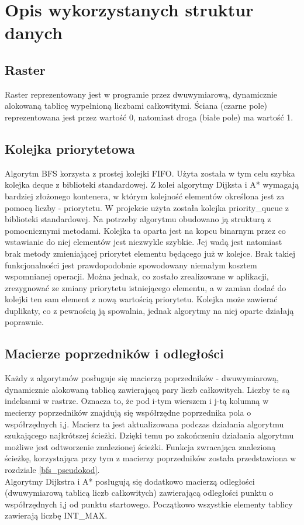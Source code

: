 \documentclass[11pt,a4paper]{article}
\begin{document}
\section{Opis wykorzystanych struktur danych}
\subsection{Raster}
Raster reprezentowany jest w programie przez dwuwymiarową, dynamicznie alokowaną tablicę
wypełnioną liczbami całkowitymi. Ściana (czarne pole) reprezentowana jest przez wartość 0, 
natomiast droga (białe pole) ma wartość 1.

\subsection{Kolejka priorytetowa}\label{priorityQueue}
Algorytm BFS korzysta z prostej kolejki FIFO. Użyta została w tym celu szybka kolejka 
deque z biblioteki standardowej. Z kolei algorytmy Dijksta i A* wymagają bardziej złożonego
kontenera, w którym kolejność elementów określona jest za pomocą liczby - priorytetu.
W projekcie użyta została kolejka priority\_queue z
biblioteki standardowej. Na potrzeby algorytmu obudowano ją strukturą z pomocnicznymi
metodami. Kolejka ta oparta jest na kopcu binarnym przez co wstawianie do niej elementów
jest niezwykle szybkie. Jej wadą jest natomiast brak metody zmieniającej priorytet
elementu będącego już w kolejce. Brak takiej funkcjonalności jest prawdopodobnie
spowodowany niemałym kosztem wspomnianej operacji. Można jednak, co zostało zrealizowane w
aplikacji, zrezygnować ze zmiany priorytetu istniejącego elementu, a w zamian dodać
do kolejki ten sam element z nową wartością priorytetu. Kolejka może zawierać duplikaty,
co z pewnością ją spowalnia, jednak algorytmy na niej oparte działają poprawnie.

\subsection{Macierze poprzedników i odległości}
Każdy z algorytmów posługuje się macierzą poprzedników - dwuwymiarową, dynamicznie
alokowaną tablicą zawierającą
pary liczb całkowitych. Liczby te są indeksami w rastrze. Oznacza to, że pod i-tym wierszem
i j-tą kolumną w mecierzy poprzedników znajdują się współrzędne poprzednika pola o
współrzędnych i,j. Macierz ta jest aktualizowana podczas działania algorytmu szukającego
najkrótszej ścieżki. Dzięki temu po zakończeniu działania algorytmu możliwe jest
odtworzenie znalezionej ścieżki. Funkcja zwracająca znalezioną ścieżkę, korzystająca
przy tym z macierzy poprzedników została przedstawiona w rozdziale \ref{bfs_pseudokod}.\\
Algorytmy Dijkstra i A* posługują się dodatkowo macierzą odległości (dwuwymiarową tablicą
liczb całkowitych) zawierającą odległości punktu o współrzędnych i,j od punktu startowego. Początkowo
wszystkie elementy tablicy zawierają liczbę INT\_MAX.
\end{document}
